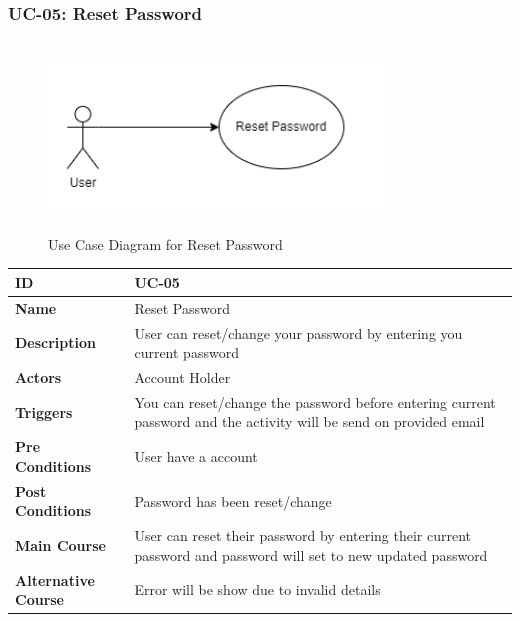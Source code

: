 \subsubsection{UC-05: Reset Password}
\begin{figure}[H]
    \includegraphics[height=5cm, width=0.8\textwidth]{./diagrams/Use Case/u5.png}
    \centering
    \caption{Use Case Diagram for Reset Password}
    \label{fig:Usecase1}
\end{figure}

\begin{center}
    \begin{tabularx}{\textwidth}{|l|X|}
        \hline
        \textbf{ID}                 & UC-05                                                                                                              \\
        \hline
        \textbf{Name}               & Reset Password                                                                                                     \\
        \hline
        \textbf{Description}        & User can reset/change your password by entering you current password                                               \\
        \hline
        \textbf{Actors}             & Account Holder                                                                                                     \\
        \hline
        \textbf{Triggers}           & You can reset/change the password before entering current password and the activity will be send on provided email \\
        \hline
        \textbf{Pre Conditions}     & User have a account                                                                                                \\
        \hline
        \textbf{Post Conditions}    & Password has been reset/change                                                                                     \\
        \hline
        \textbf{Main Course}        & User can reset their password by entering their current password and password will set to new updated password     \\
        \hline
        \textbf{Alternative Course} & Error will be show due to invalid details                                                                          \\
        \hline
    \end{tabularx}
\end{center}
\newpage


